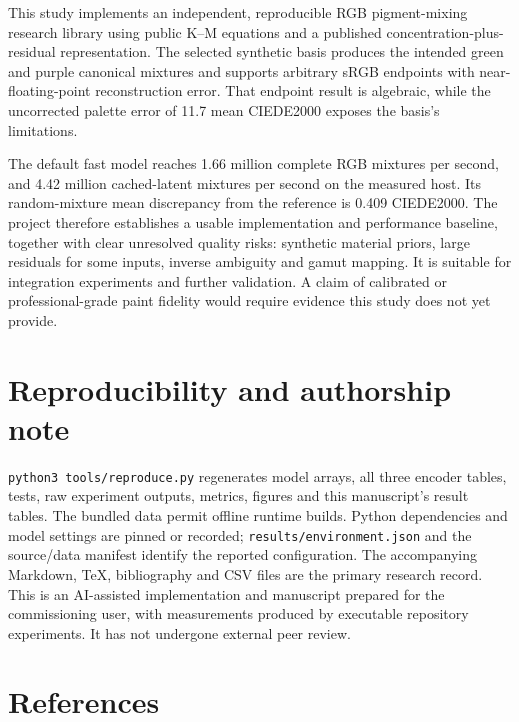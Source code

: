 \documentclass[
  10pt,
  twocolumn]{article}
\begin{document}
This study implements an independent, reproducible RGB pigment-mixing
research library using public K--M equations and a published
concentration-plus-residual representation. The selected synthetic basis
produces the intended green and purple canonical mixtures and supports
arbitrary sRGB endpoints with near-floating-point reconstruction error.
That endpoint result is algebraic, while the uncorrected palette error
of 11.7 mean CIEDE2000 exposes the basis's limitations.

The default fast model reaches 1.66 million complete RGB mixtures per
second, and 4.42 million cached-latent mixtures per second on the
measured host. Its random-mixture mean discrepancy from the reference is
0.409 CIEDE2000. The project therefore establishes a usable
implementation and performance baseline, together with clear unresolved
quality risks: synthetic material priors, large residuals for some
inputs, inverse ambiguity and gamut mapping. It is suitable for
integration experiments and further validation. A claim of calibrated or
professional-grade paint fidelity would require evidence this study does
not yet provide.

\hypertarget{reproducibility-and-authorship-note}{%
\section{Reproducibility and authorship
note}\label{reproducibility-and-authorship-note}}

\texttt{python3\ tools/reproduce.py} regenerates model arrays, all three
encoder tables, tests, raw experiment outputs, metrics, figures and this
manuscript's result tables. The bundled data permit offline runtime
builds. Python dependencies and model settings are pinned or recorded;
\texttt{results/environment.json} and the source/data manifest identify
the reported configuration. The accompanying Markdown, TeX, bibliography
and CSV files are the primary research record. This is an AI-assisted
implementation and manuscript prepared for the commissioning user, with
measurements produced by executable repository experiments. It has not
undergone external peer review.

\hypertarget{references}{%
\section*{References}\label{references}}
\end{document}
